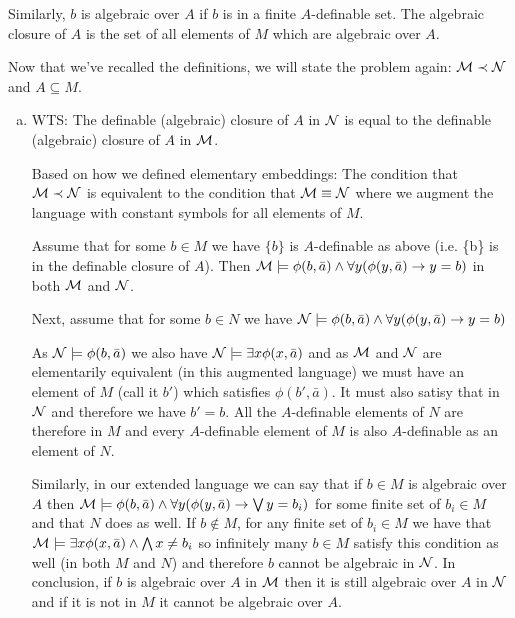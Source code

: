\begin{enumerate}[1.]
Similarly, \(b\) is algebraic over \(A\) if \(b\) is in a finite \(A\)-definable set. 
The algebraic closure of \(A\) is the set of all elements of \(M\) which are algebraic over \(A\).

Now that we've recalled the definitions, we will state the problem again: 
\(\mathcal{M} \prec \mathcal{N}\) and \(A \subseteq M\).
\begin{enumerate}[a)]
  \item WTS: The definable (algebraic) closure of \(A\) in \(\mathcal{N}\) is equal to the definable (algebraic) closure of \(A\) in \(\mathcal{M}\).

  Based on how we defined elementary embeddings: The condition that \(\mathcal{M} \prec \mathcal{N}\) is equivalent to the condition that \(\mathcal{M} \equiv \mathcal{N}\) where we augment the language with constant symbols for all elements of \(M\). 

  Assume that for some \(b \in M\) we have \(\{b\}\) is \(A\)-definable as above (i.e. \{b\} is in the definable closure of \(A\)). 
Then \(\mathcal{M} \models \phi(b, \bar{a}) \land \forall y (\phi(y, \bar{a}) \to y = b)\) in both \(\mathcal{M}\) and \(\mathcal{N}\). 

  Next, assume that for some \(b \in N\) we have \(\mathcal{N} \models \phi(b, \bar{a}) \land \forall y (\phi(y, \bar{a}) \to y = b)\)

  As \(\mathcal{N} \models \phi(b, \bar{a})\) we also have \(\mathcal{N} \models \exists x \phi(x, \bar{a})\) and as \(\mathcal{M}\) and \(\mathcal{N}\) are elementarily equivalent (in this augmented language) we must have an element of \(M\) (call it \(b'\)) which satisfies \(\phi(b', \bar{a})\). 
  It must also satisy that in \(\mathcal{N}\) and therefore we have \(b' = b\). 
  All the \(A\)-definable elements of \(N\) are therefore in \(M\) and every \(A\)-definable element of \(M\) is also \(A\)-definable as an element of \(N\).

  Similarly, in our extended language we can say that if \(b \in M\) is algebraic over \(A\) then \(\mathcal{M} \models \phi(b, \bar{a}) \land \forall y (\phi(y, \bar{a}) \to \bigvee y = b_i)\) for some finite set of \(b_i \in M\) and that \(N\) does as well. 
  If \(b \notin M\), for any finite set of \(b_i \in M\) we have that \(\mathcal{M} \models \exists x \phi(x, \bar{a}) \land \bigwedge x \neq b_i\) so infinitely many \(b \in M\) satisfy this condition as well (in both \(M\) and \(N\)) and therefore \(b\) cannot be algebraic in \(\mathcal{N}\). 
  In conclusion, if \(b\) is algebraic over \(A\) in \(\mathcal{M}\) then it is still algebraic over \(A\) in \(\mathcal{N}\) and if it is not in \(M\) it cannot be algebraic over \(A\). 


\end{enumerate}
\end{enumerate}
